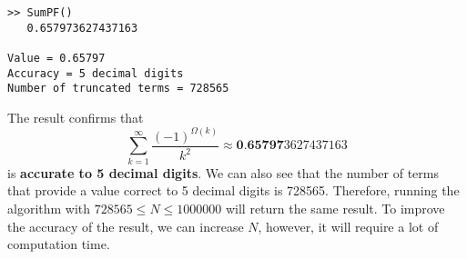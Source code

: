 \documentclass[11pt]{report}
\begin{document}
\begin{lstlisting}[title={N=1000000}]
>> SumPF()
   0.657973627437163

Value = 0.65797
Accuracy = 5 decimal digits
Number of truncated terms = 728565
\end{lstlisting}
The result confirms that 
\begin{equation*}
	\sum_{k=1}^{\infty} \frac{(-1)^{\Omega(k)}}{k^2} \approx \textbf{0.65797}3627437163
\end{equation*}
is \textbf{accurate to 5 decimal digits}. We can also see that the number of terms that provide a value correct to 5 decimal digits is 728565. Therefore, running the algorithm with $728565 \leq N \leq 1000000$ will return the same result. To improve the accuracy of the result, we can increase $N$, however, it will require a lot of computation time.
\end{document}
